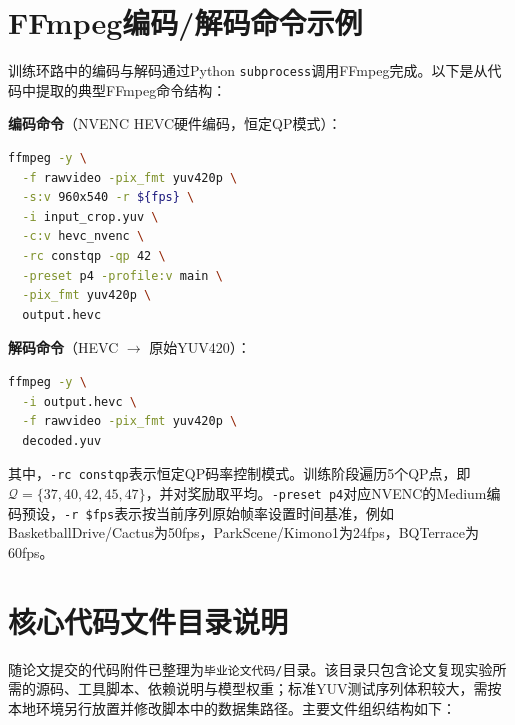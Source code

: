 \FloatBarrier

\section{FFmpeg编码/解码命令示例}

训练环路中的编码与解码通过Python \texttt{subprocess}调用FFmpeg完成。以下是从代码中提取的典型FFmpeg命令结构：

\noindent\textbf{编码命令}（NVENC HEVC硬件编码，恒定QP模式）：
\begin{lstlisting}[language=bash,basicstyle=\ttfamily\small,breaklines=true]
ffmpeg -y \
  -f rawvideo -pix_fmt yuv420p \
  -s:v 960x540 -r ${fps} \
  -i input_crop.yuv \
  -c:v hevc_nvenc \
  -rc constqp -qp 42 \
  -preset p4 -profile:v main \
  -pix_fmt yuv420p \
  output.hevc
\end{lstlisting}

\noindent\textbf{解码命令}（HEVC $\rightarrow$ 原始YUV420）：
\begin{lstlisting}[language=bash,basicstyle=\ttfamily\small,breaklines=true]
ffmpeg -y \
  -i output.hevc \
  -f rawvideo -pix_fmt yuv420p \
  decoded.yuv
\end{lstlisting}

\noindent 其中，\texttt{-rc constqp}表示恒定QP码率控制模式。训练阶段遍历5个QP点，即$\mathcal{Q}=\{37,40,42,45,47\}$，并对奖励取平均。\texttt{-preset p4}对应NVENC的Medium编码预设，\texttt{-r \${fps}}表示按当前序列原始帧率设置时间基准，例如BasketballDrive/Cactus为50fps，ParkScene/Kimono1为24fps，BQTerrace为60fps。

\section{核心代码文件目录说明}

随论文提交的代码附件已整理为\texttt{毕业论文代码/}目录。该目录只包含论文复现实验所需的源码、工具脚本、依赖说明与模型权重；标准YUV测试序列体积较大，需按本地环境另行放置并修改脚本中的数据集路径。主要文件组织结构如下：


